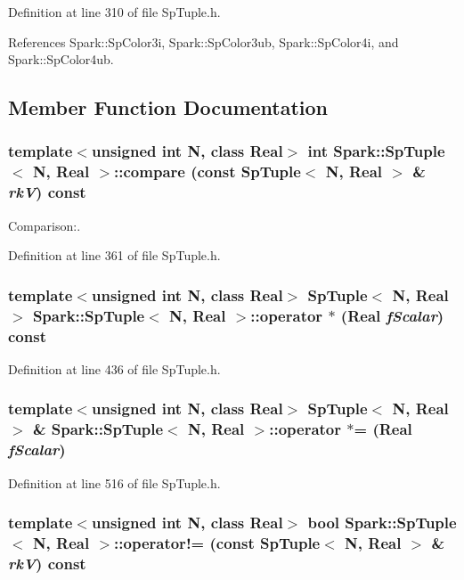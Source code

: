 Definition at line 310 of file Sp\-Tuple.h.

References Spark::Sp\-Color3i, Spark::Sp\-Color3ub, Spark::Sp\-Color4i, and Spark::Sp\-Color4ub.

\subsection{Member Function Documentation}
\subsubsection{\setlength{\rightskip}{0pt plus 5cm}template$<$unsigned int N, class Real$>$ int {\bf Spark::Sp\-Tuple}$<$ N, Real $>$::compare (const {\bf Sp\-Tuple}$<$ N, Real $>$ \& {\em rk\-V}) const\hspace{0.3cm}{\tt  [protected]}}\label{classSpark_1_1SpTuple_b0}


Comparison:. 

Definition at line 361 of file Sp\-Tuple.h.
\subsubsection{\setlength{\rightskip}{0pt plus 5cm}template$<$unsigned int N, class Real$>$ {\bf Sp\-Tuple}$<$ N, Real $>$ {\bf Spark::Sp\-Tuple}$<$ N, Real $>$::operator $\ast$ (Real {\em f\-Scalar}) const}\label{classSpark_1_1SpTuple_a19}


Definition at line 436 of file Sp\-Tuple.h.
\subsubsection{\setlength{\rightskip}{0pt plus 5cm}template$<$unsigned int N, class Real$>$ {\bf Sp\-Tuple}$<$ N, Real $>$ \& {\bf Spark::Sp\-Tuple}$<$ N, Real $>$::operator $\ast$= (Real {\em f\-Scalar})}\label{classSpark_1_1SpTuple_a26}


Definition at line 516 of file Sp\-Tuple.h.
\subsubsection{\setlength{\rightskip}{0pt plus 5cm}template$<$unsigned int N, class Real$>$ bool {\bf Spark::Sp\-Tuple}$<$ N, Real $>$::operator!= (const {\bf Sp\-Tuple}$<$ N, Real $>$ \& {\em rk\-V}) const}\label{classSpark_1_1SpTuple_a10}


